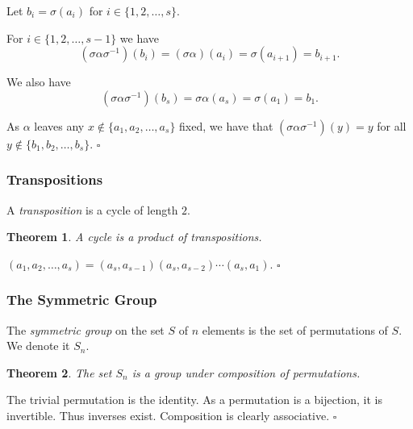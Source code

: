 \documentclass[10pt]{article}
\newtheorem{theorem}{Theorem}[section]
\newenvironment{proof}[1][Proof]{\begin{trivlist}
\item[\hskip \labelsep {\itshape #1}]}{\end{trivlist}}
\newenvironment{definition}[1][Definition]{\begin{trivlist}
\item[\hskip \labelsep {\bfseries #1}]}{\end{trivlist}}
\begin{document}
\begin{proof}
Let $b_i = \sigma(a_i)$ for $i \in \{1, 2, \ldots, s\}$.

For $i \in \{1, 2, \ldots, s-1\}$ we have
$$(\sigma\alpha\sigma^{-1})(b_i) = (\sigma\alpha)(a_i) = \sigma(a_{i+1}) = b_{i+1}.$$

We also have
$$(\sigma\alpha\sigma^{-1})(b_s) = \sigma\alpha(a_s) = \sigma(a_1) = b_1.$$

As $\alpha$ leaves any $x \not\in \{a_1, a_2, \ldots, a_s\}$ fixed, we have that $(\sigma\alpha\sigma^{-1})(y) = y$ for all $y \not\in \{b_1, b_2, \ldots, b_s\}$. $\square$
\end{proof}

\subsubsection{Transpositions}

\begin{definition}
A \emph{transposition} is a cycle of length $2$.
\end{definition}

\begin{theorem}
A cycle is a product of transpositions.
\end{theorem}

\begin{proof}
$(a_1, a_2, \ldots, a_s) = (a_s, a_{s-1})(a_s, a_{s - 2})\cdots(a_s, a_1)$. $\square$
\end{proof}

\subsubsection{The Symmetric Group}

\begin{definition}
The \emph{symmetric group} on the set $S$ of $n$ elements is the set of permutations of $S$. We denote it $S_n$.
\end{definition}

\begin{theorem}
The set $S_n$ is a group under composition of permutations.
\end{theorem}

\begin{proof}
The trivial permutation is the identity. As a permutation is a bijection, it is invertible. Thus inverses exist. Composition is clearly associative. $\square$
\end{proof}
\end{document}
